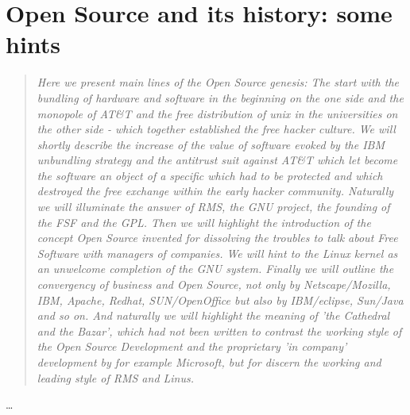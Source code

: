 %
%
%
%
%



\section{Open Source and its history: some hints}
\footnotesize
\begin{quote}\itshape
Here we present main lines of the Open Source genesis: The start with the
bundling of hardware and software in the beginning on the one side and the
monopole of AT\&T and the free distribution of unix in the universities on the
other side - which together established the free hacker culture. We will shortly
describe the increase of the value of software evoked by the IBM unbundling
strategy and the antitrust suit against AT\&T which let become the software an
object of a specific which had to be protected and which
destroyed the free exchange within the early hacker community. Naturally we will illuminate the answer of RMS, the
GNU project, the founding of the FSF and the GPL. Then we will highlight the
introduction of the concept Open Source invented for dissolving the troubles to
talk about Free Software with managers of companies. We will hint to the Linux
kernel as an unwelcome completion of the GNU system. Finally we will outline the
convergency of business and Open Source, not only by Netscape/Mozilla, IBM,
Apache, Redhat, SUN/OpenOffice but also by IBM/eclipse, Sun/Java and so on. And
naturally we will highlight the meaning of 'the Cathedral and the Bazar', which
had not been written to contrast the working style of the Open Source
Development and the proprietary 'in company' development by for example
Microsoft, but for discern the working and leading style of RMS and Linus.
\end{quote}
\normalsize
\ldots

%
